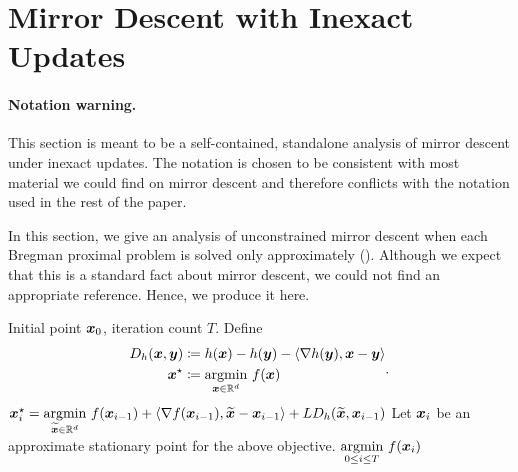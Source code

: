 \section{Mirror Descent with Inexact Updates}
\label{sec:mirror_descent}

\paragraph{Notation warning.} This section is meant to be a self-contained, standalone analysis of mirror descent under inexact updates. The notation is chosen to be consistent with most material we could find on mirror descent and therefore conflicts with the notation used in the rest of the paper.

In this section, we give an analysis of unconstrained mirror descent when each Bregman proximal problem is solved only approximately (). Although we expect that this is a standard fact about mirror descent, we could not find an appropriate reference. Hence, we produce it here.

\begin{algorithm}[H]
\caption{\textsf{ApproximateMirrorDescent}: Implements mirror descent to optimize convex and differentiable $f$ given $L$-relative smoothness and $\mu$-relative strong convexity in the reference $h$ when we may not be able to solve each proximal problem exactly.}
\label{alg:mirror_descent}
\begin{algorithmic}[1]
\Require Initial point $\bm{x}_0$, iteration count $T$.
\State Define \begin{equation*}
    \begin{aligned}
    D_{h}(\bm{x},\bm{y}) &\coloneqq h(\bm{x})-h(\bm{y})-\left\langle \nabla h(\bm{y}),\bm{x}-\bm{y} \right\rangle \\
    \bm{x}^{\star} &\coloneqq \underset{\bm{x}\in\mathbb{R}^d}{\mathrm{argmin}}\  f(\bm{x})
    \end{aligned}.
\end{equation*}
    \State $\bm{x}^{\star}_i = \underset{\widetilde{\bm{x}} \in \mathbb{R}^d}{\mathrm{argmin}}\  f(\bm{x}_{i-1}) + \left\langle \nabla f(\bm{x}_{i-1}), \widetilde{\bm{x}}-\bm{x}_{i-1} \right\rangle + LD_h(\widetilde{\bm{x}},\bm{x}_{i-1})$ \label{line:mirror_descent_exact} 
    \State Let $\bm{x}_i$ be an approximate stationary point for the above objective.\label{line:mirror_descent_approx}
\EndFor
\Return $\underset{0 \le i \le T}{\mathrm{argmin}}\  f(\bm{x}_i)$
\end{algorithmic}
\end{algorithm}

